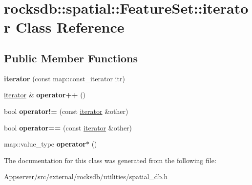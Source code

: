 \hypertarget{classrocksdb_1_1spatial_1_1FeatureSet_1_1iterator}{}\section{rocksdb\+:\+:spatial\+:\+:Feature\+Set\+:\+:iterator Class Reference}
\label{classrocksdb_1_1spatial_1_1FeatureSet_1_1iterator}
\subsection*{Public Member Functions}
\begin{DoxyCompactItemize}
\item 
{\bfseries iterator} (const map\+::const\+\_\+iterator itr)\hypertarget{classrocksdb_1_1spatial_1_1FeatureSet_1_1iterator_ae304e183b0bca7bf8a8df6c369e4ff26}{}\label{classrocksdb_1_1spatial_1_1FeatureSet_1_1iterator_ae304e183b0bca7bf8a8df6c369e4ff26}

\item 
\hyperlink{classrocksdb_1_1spatial_1_1FeatureSet_1_1iterator}{iterator} \& {\bfseries operator++} ()\hypertarget{classrocksdb_1_1spatial_1_1FeatureSet_1_1iterator_a9803e5c13f12e042522759a93ef49a72}{}\label{classrocksdb_1_1spatial_1_1FeatureSet_1_1iterator_a9803e5c13f12e042522759a93ef49a72}

\item 
bool {\bfseries operator!=} (const \hyperlink{classrocksdb_1_1spatial_1_1FeatureSet_1_1iterator}{iterator} \&other)\hypertarget{classrocksdb_1_1spatial_1_1FeatureSet_1_1iterator_ac5da3aaeb0a2148fd09d14c523e9c076}{}\label{classrocksdb_1_1spatial_1_1FeatureSet_1_1iterator_ac5da3aaeb0a2148fd09d14c523e9c076}

\item 
bool {\bfseries operator==} (const \hyperlink{classrocksdb_1_1spatial_1_1FeatureSet_1_1iterator}{iterator} \&other)\hypertarget{classrocksdb_1_1spatial_1_1FeatureSet_1_1iterator_ac004d255ac5077e92c07e59e969ea6b7}{}\label{classrocksdb_1_1spatial_1_1FeatureSet_1_1iterator_ac004d255ac5077e92c07e59e969ea6b7}

\item 
map\+::value\+\_\+type {\bfseries operator$\ast$} ()\hypertarget{classrocksdb_1_1spatial_1_1FeatureSet_1_1iterator_a7d907bf24008cbd05db40942ed0931b1}{}\label{classrocksdb_1_1spatial_1_1FeatureSet_1_1iterator_a7d907bf24008cbd05db40942ed0931b1}

\end{DoxyCompactItemize}


The documentation for this class was generated from the following file\+:\begin{DoxyCompactItemize}
\item 
Appserver/src/external/rocksdb/utilities/spatial\+\_\+db.\+h\end{DoxyCompactItemize}

